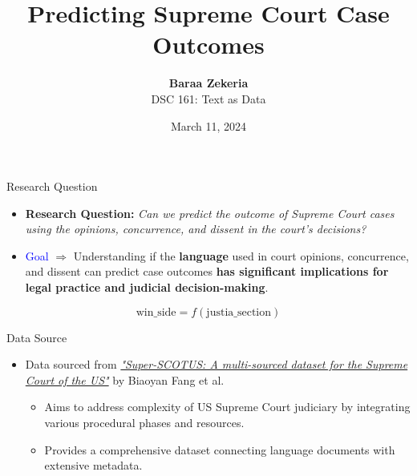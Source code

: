 \documentclass{beamer}
\begin{document}
\title{Predicting Supreme Court Case Outcomes}
\author{\textbf{Baraa Zekeria} \\ DSC 161: Text as Data}
\date{March 11, 2024}

\begin{frame}
\titlepage
\end{frame}


\begin{frame}{Research Question}
\begin{itemize}
    \item \textbf{Research Question:} \textit{Can we predict the outcome of Supreme Court cases using the opinions, concurrence, and dissent in the court's decisions?}
    \item \textcolor{blue}{Goal} $\Rightarrow$ Understanding if the \textbf{language} used in court opinions, concurrence, and dissent can predict case outcomes \textbf{has significant implications for legal practice and judicial decision-making}.
\end{itemize}

$$\text{win\_side} = f(\text{justia\_section})$$

\end{frame}


\begin{frame}{Data Source}
\begin{itemize}
    \item Data sourced from \href{https://aclanthology.org/2023.nllp-1.20/}{\textit{"Super-SCOTUS: A multi-sourced dataset for the Supreme Court of the US"}} by Biaoyan Fang et al.
    \begin{itemize}
        \item Aims to address complexity of US Supreme Court judiciary by integrating various procedural phases and resources.
        \item Provides a comprehensive dataset connecting language documents with extensive metadata.
    \end{itemize}
\end{itemize}
\end{frame}
\end{document}
